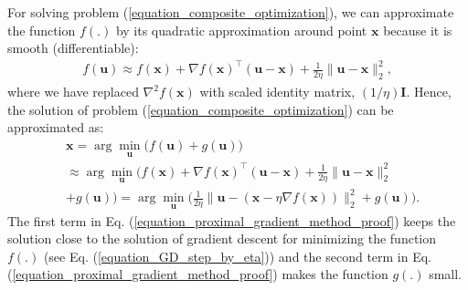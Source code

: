 \documentclass[lang=cn,10pt]{gorgeousnbook}
\numberwithin{equation}{section}%
\numberwithin{figure}{section}%
\begin{document}
For solving problem (\ref{equation_composite_optimization}), we can approximate the function $f(.)$ by its quadratic approximation around point $\boldsymbol{x}$ because it is smooth (differentiable):
\begin{align*}
f(\boldsymbol{u}) \approx f(\boldsymbol{x}) + \nabla f(\boldsymbol{x})^\top (\boldsymbol{u} - \boldsymbol{x}) + \frac{1}{2 \eta} \|\boldsymbol{u} - \boldsymbol{x}\|_2^2,
\end{align*}
where we have replaced $\nabla^2 f(\boldsymbol{x})$ with scaled identity matrix, $(1/\eta) \boldsymbol{I}$. Hence, the solution of problem (\ref{equation_composite_optimization}) can be approximated as:
\begin{align}
&\boldsymbol{x} = \arg \min_{\boldsymbol{u}} \big(f(\boldsymbol{u}) + g(\boldsymbol{u})\big) \nonumber\\
&\approx \arg \min_{\boldsymbol{u}} \big(f(\boldsymbol{x}) + \nabla f(\boldsymbol{x})^\top (\boldsymbol{u} - \boldsymbol{x}) + \frac{1}{2 \eta} \|\boldsymbol{u} - \boldsymbol{x}\|_2^2 \nonumber\\
&+ g(\boldsymbol{u})\big) = \arg \min_{\boldsymbol{u}} \big(\frac{1}{2\eta} \|\boldsymbol{u} - (\boldsymbol{x} - \eta \nabla f(\boldsymbol{x}))\|_2^2 + g(\boldsymbol{u})\big). \label{equation_proximal_gradient_method_proof}
\end{align}
The first term in Eq. (\ref{equation_proximal_gradient_method_proof}) keeps the solution close to the solution of gradient descent for minimizing the function $f(.)$ (see Eq. (\ref{equation_GD_step_by_eta})) and the second term in Eq. (\ref{equation_proximal_gradient_method_proof}) makes the function $g(.)$ small. 
\end{document}

